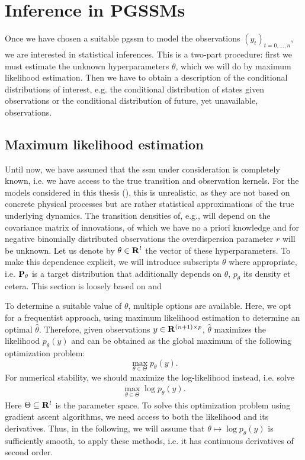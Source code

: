\section{Inference in PGSSMs}
\label{sec:maximum_likelihood_estimation}

Once we have chosen a suitable \acrshort{pgssm} to model the observations $\left( y_{t} \right)_{t = 0, \dots, n}$, we are interested in statistical inferences. This is a two-part procedure: first we must estimate the unknown hyperparameters $\theta$, which we will do by maximum likelihood estimation. Then we have to obtain a description of the conditional distributions of interest, e.g. the conditional distribution of states given observations or the conditional distribution of future, yet unavailable, observations. 

\subsection{Maximum likelihood estimation}
Until now, we have assumed that the \acrshort{ssm} under consideration is completely known, i.e. we have access to the true transition and observation kernels. For the models considered in this thesis (), this is unrealistic, as they are not based on concrete physical processes but are rather statistical approximations of the true underlying dynamics. The transition densities of, e.g.,  will depend on the covariance matrix of innovations, of which we have no a priori knowledge and for negative binomially distributed observations the overdispersion parameter $r$ will be unknown. Let us denote by $\theta\in\R^{l}$ the vector of these hyperparameters. 
To make this dependence explicit, we will introduce subscripts $\theta$ where appropriate, i.e. $\P_{\theta}$ is a target distribution that additionally depends on $\theta$, $p_{\theta}$ its density et cetera. This section is loosely based on \citep[Chapter 7 \& 11]{Durbin2012Time} and \citep[Chapter 14]{Chopin2020Introduction}

To determine a suitable value of $\theta$, multiple options are available. Here, we opt for a frequentist approach, using maximum likelihood estimation to determine an optimal $\hat \theta$. Therefore, given observations $y\in\R^{(n+1)\times p}$, $\hat\theta$ maximizes the likelihood $p_{\theta}(y)$ and can be obtained as the global maximum of the following optimization problem: 
$$
    \max_{\theta \in \Theta} p_{\theta}(y).
$$
For numerical stability, we should maximize the log-likelihood instead, i.e. solve 
\begin{align}
    \label{eq:max-log-p}
    \max_{\theta \in \Theta} \log p_{\theta}(y).
\end{align}
Here $\Theta \subseteq \R^{l}$ is the parameter space. To solve this optimization problem using gradient ascent algorithms, we need access to both the likelihood and its derivatives. Thus, in the following, we will assume that $\theta \mapsto \log p_{\theta}(y)$ is sufficiently smooth, to apply these methods, i.e. it has continuous derivatives of second order. 

